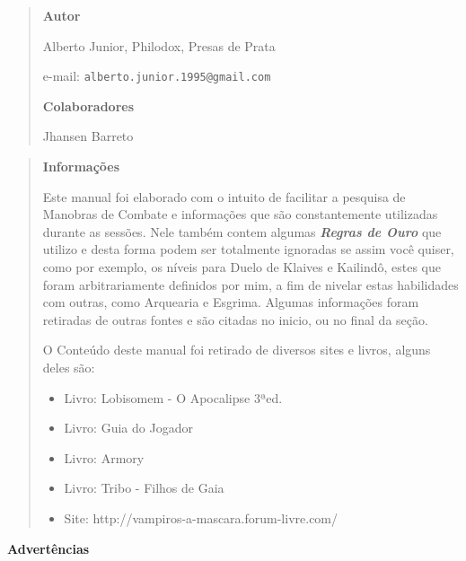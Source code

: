 \begin{quote}
\begin{center}
{\Huge \bf Autor}
\end{center}
Alberto Junior, Philodox, Presas de Prata

e-mail: \texttt{alberto.junior.1995@gmail.com}

\begin{center}
{\Large \bf Colaboradores}
\end{center}
Jhansen Barreto
\end{quote}

\begin{quote}
\begin{center}
{\Huge \bf Informações}
\end{center}
Este manual foi elaborado com o intuito de facilitar a pesquisa de Manobras de Combate e informações que são constantemente utilizadas durante as sessões. Nele também contem algumas {\bf \textit{Regras de Ouro}} que utilizo e desta forma podem ser totalmente ignoradas se assim você quiser, como por exemplo, os níveis para Duelo de Klaives e Kailindô, estes que foram arbitrariamente definidos por mim, a fim de nivelar estas habilidades com outras, como Arquearia e Esgrima. Algumas informações foram retiradas de outras fontes e são citadas no inicio, ou no final da seção.

O Conteúdo deste manual foi retirado de diversos sites e livros, alguns deles são:
\begin{itemize}[noitemsep]
    \item Livro: Lobisomem - O Apocalipse 3ªed.
    \item Livro: Guia do Jogador
    \item Livro: Armory
    \item Livro: Tribo - Filhos de Gaia
    \item Site: http://vampiros-a-mascara.forum-livre.com/
\end{itemize}
\end{quote}


\begin{center}
{\Huge \bf Advertências}
\end{center}

